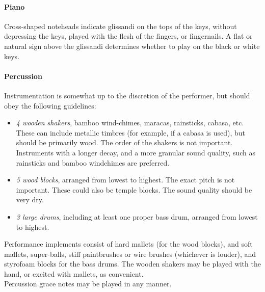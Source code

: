 \documentclass[11pt]{report}
\begin{document}
\begin{titlepage}
\begin{multicols}{2}
{    \paragraph{Piano}

    Cross-shaped noteheads indicate glissandi on the tops of the keys, without
    depressing the keys, played with the flesh of the fingers, or fingernails.
    A flat or natural sign above the glissandi determines whether to play on
    the black or white keys.

    \paragraph{Percussion}
    
    Instrumentation is somewhat up to the discretion of the performer, but
    should obey the following guidelines:

    \begin{itemize}
        
        \item \emph{4 wooden shakers}, bamboo wind-chimes, maracas, rainsticks,
        cabasa, etc. These can include metallic timbres (for example, if a
        cabasa is used), but should be primarily wood. The order of the shakers
        is not important.  Instruments with a longer decay, and a more granular
        sound quality, such as rainsticks and bamboo windchimes are preferred.

        \item \emph{5 wood blocks}, arranged from lowest to highest.  The
        exact pitch is not important. These could also be temple blocks. The
        sound quality should be very dry.

        \item \emph{3 large drums}, including at least one proper bass drum,
        arranged from lowest to highest.

    \end{itemize}

    Performance implements consist of hard mallets (for the wood blocks), and
    soft mallets, super-balls, stiff paintbrushes or wire brushes (whichever is
    louder), and styrofoam blocks for the bass drums. The wooden shakers may be
    played with the hand, or excited with mallets, as convenient.\\

    Percussion grace notes may be played in any manner.
    
}

\end{multicols}
\end{titlepage}
\end{document}
